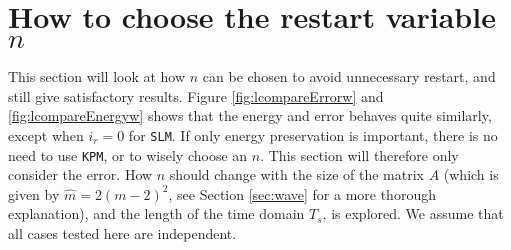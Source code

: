 \section{How to choose the restart variable $n$}%
\label{sec:resultat}
This section will look at how $n$ can be chosen to avoid unnecessary restart, and still give satisfactory results. Figure \ref{fig:lcompareErrorw} and \ref{fig:lcompareEnergyw} shows that the energy and error behaves quite similarly, except when $i_r = 0$ for \texttt{SLM}. If only energy preservation is important, there is no need to use \texttt{KPM}, or to wisely choose an $n$. This section will therefore only consider the error.  How $n$ should change with the size of the matrix $A$ (which is given by $\hat{m} = 2(m-2)^2$, see Section \ref{sec:wave} for a more thorough explanation), and the length of the time domain $T_s$, is explored. We assume that all cases tested here are independent. 

